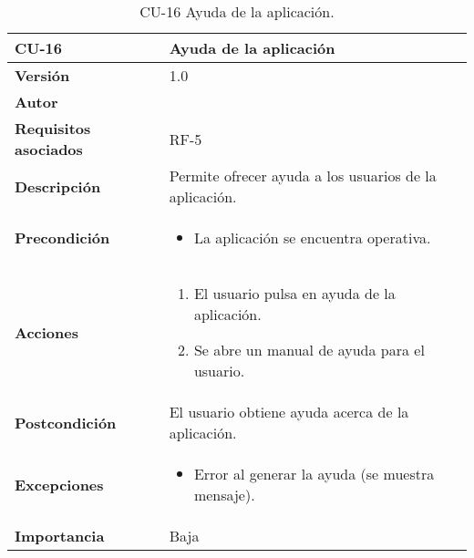 \begin{table}[p]
	\centering
	\begin{tabularx}{\linewidth}{ p{} p{} }
		\toprule
		\textbf{CU-16}    & \textbf{ Ayuda de la aplicación}\\
		\toprule
		\textbf{Versión}              & 1.0    \\
		\textbf{Autor}                & \@author{} \\
		\textbf{Requisitos asociados} & RF-5\\
		\textbf{Descripción}          & Permite ofrecer ayuda a los usuarios de la aplicación. \\
		\textbf{Precondición}         &
		\begin{itemize}
			\tightlist
			\item La aplicación se encuentra operativa.
		\end{itemize}\\
		\textbf{Acciones}             &
		\begin{enumerate}
			\tightlist
			\item El usuario pulsa en ayuda de la aplicación.
			\item Se abre un manual de ayuda para el usuario.
		\end{enumerate}\\
		\textbf{Postcondición}        & El usuario obtiene ayuda acerca de la aplicación.\\
		\textbf{Excepciones}          &
		\begin{itemize}
			\tightlist
			\item Error al generar la ayuda (se muestra mensaje).
		\end{itemize}\\
		\textbf{Importancia}          & Baja\\
		\bottomrule
	\end{tabularx}
	\caption{CU-16 Ayuda de la aplicación.}\label{tab:table-16}
\end{table}
